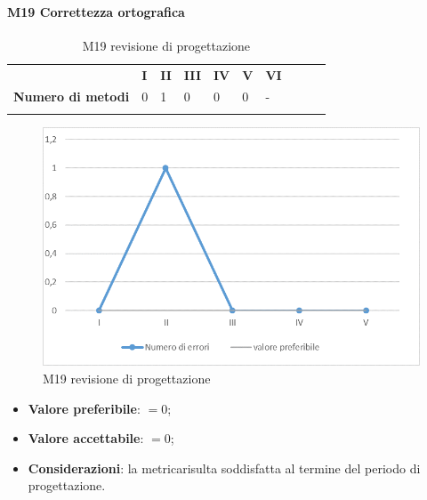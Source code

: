 \paragraph{M19 Correttezza ortografica} \mbox{}
\begin{longtable}[H!] {						
		>{}p{50mm}  		
		>{}p{8mm}
		>{}p{8mm}		
		>{}p{8mm}		
		>{}p{8mm}		
		>{}p{8mm}		
		>{}p{8mm}
		>{}p{8mm}
		>{}p{8mm}
		>{}p{8mm}
	}
	\rowcolor{gray!50}
	\textbf{} & \textbf{I} & \textbf{II} & \textbf{III} & \textbf{IV} & \textbf{V} & \textbf{VI} \TBstrut \\ [2mm]
	\textbf{Numero di metodi} & 0 & 1 & 0 & 0 & 0 & - \TBstrut \\ [2mm]
	\rowcolor{white}
	\caption{M19 revisione di progettazione\glo}
\end{longtable}
\begin{figure}[H] 	
	\includegraphics[width=\linewidth]{./img/grafici/RP17.png}	
	\caption{M19 revisione di progettazione\glo}	
\end{figure}
\begin{itemize}
	\item \textbf{Valore preferibile}: $=0$;
	\item \textbf{Valore accettabile}: $=0$;
	\item \textbf{Considerazioni}: la metrica\glosp risulta soddisfatta al termine del periodo di progettazione\glo.
\end{itemize}

